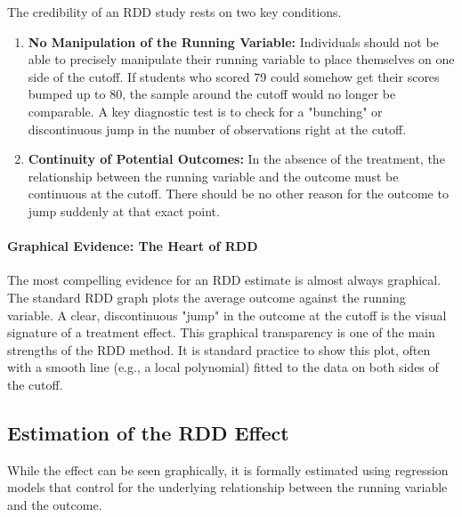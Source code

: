 \documentclass{article}
\providecommand{\tightlist}{
  \setlength{\itemsep}{0pt}
  \setlength{\parskip}{0pt}}
\begin{document}
The credibility of an RDD study rests on two key conditions.
\begin{enumerate}
    \tightlist
    \item \textbf{No Manipulation of the Running Variable:} Individuals should not be able to precisely manipulate their running variable to place themselves on one side of the cutoff. If students who scored 79 could somehow get their scores bumped up to 80, the sample around the cutoff would no longer be comparable. A key diagnostic test is to check for a "bunching" or discontinuous jump in the number of observations right at the cutoff.
    \item \textbf{Continuity of Potential Outcomes:} In the absence of the treatment, the relationship between the running variable and the outcome must be continuous at the cutoff. There should be no other reason for the outcome to jump suddenly at that exact point.
\end{enumerate}

\paragraph{Graphical Evidence: The Heart of RDD}
The most compelling evidence for an RDD estimate is almost always graphical. The standard RDD graph plots the average outcome against the running variable. A clear, discontinuous "jump" in the outcome at the cutoff is the visual signature of a treatment effect. This graphical transparency is one of the main strengths of the RDD method. It is standard practice to show this plot, often with a smooth line (e.g., a local polynomial) fitted to the data on both sides of the cutoff.



\subsection{Estimation of the RDD Effect}
\label{sub:rdd_estimation}

While the effect can be seen graphically, it is formally estimated using regression models that control for the underlying relationship between the running variable and the outcome.
\end{document}
